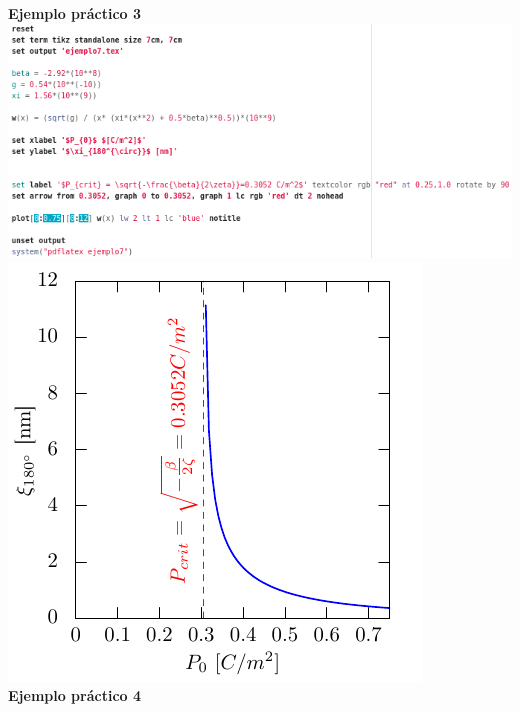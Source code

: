 \documentclass[11.5pt,a4paper]{article}
\begin{document}
\textbf{Ejemplo práctico 3}\\

\includegraphics[scale=0.50]{screen5.png}
\includegraphics[scale=0.80]{ejemplo7.pdf}\\

\textbf{Ejemplo práctico 4}\\
\end{document}
